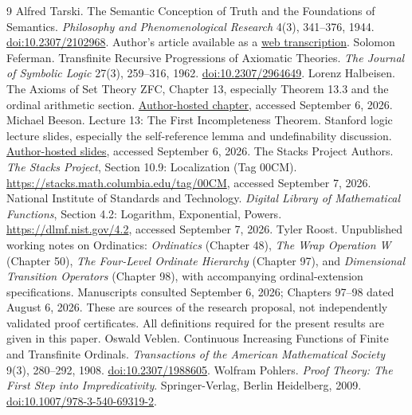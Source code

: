 \documentclass[11pt]{article}
\theoremstyle{definition}
\begin{document}
\begin{thebibliography}{9}
\small
{} Alfred Tarski. The Semantic Conception of Truth and the Foundations of Semantics. \emph{Philosophy and Phenomenological Research} 4(3), 341--376, 1944. \href{https://doi.org/10.2307/2102968}{doi:10.2307/2102968}. Author's article available as a \href{https://www.jfsowa.com/logic/tarski.htm}{web transcription}.
 Solomon Feferman. Transfinite Recursive Progressions of Axiomatic Theories. \emph{The Journal of Symbolic Logic} 27(3), 259--316, 1962. \href{https://doi.org/10.2307/2964649}{doi:10.2307/2964649}.
 Lorenz Halbeisen. The Axioms of Set Theory ZFC, Chapter 13, especially Theorem 13.3 and the ordinal arithmetic section. \href{https://people.math.ethz.ch/~halorenz/4students/LogikGT/Ch13.pdf}{Author-hosted chapter}, accessed September 6, 2026.
 Michael Beeson. Lecture 13: The First Incompleteness Theorem. Stanford logic lecture slides, especially the self-reference lemma and undefinability discussion. \href{https://www.michaelbeeson.com/teaching/StanfordLogic/Lecture13Slides.pdf}{Author-hosted slides}, accessed September 6, 2026.
 The Stacks Project Authors. \emph{The Stacks Project}, Section 10.9: Localization (Tag 00CM). \url{https://stacks.math.columbia.edu/tag/00CM}, accessed September 7, 2026.
 National Institute of Standards and Technology. \emph{Digital Library of Mathematical Functions}, Section 4.2: Logarithm, Exponential, Powers. \url{https://dlmf.nist.gov/4.2}, accessed September 7, 2026.
 Tyler Roost. Unpublished working notes on Ordinatics: \emph{Ordinatics} (Chapter 48), \emph{The Wrap Operation W} (Chapter 50), \emph{The Four-Level Ordinate Hierarchy} (Chapter 97), and \emph{Dimensional Transition Operators} (Chapter 98), with accompanying ordinal-extension specifications. Manuscripts consulted September 6, 2026; Chapters 97--98 dated August 6, 2026. These are sources of the research proposal, not independently validated proof certificates. All definitions required for the present results are given in this paper.
 Oswald Veblen. Continuous Increasing Functions of Finite and Transfinite Ordinals. \emph{Transactions of the American Mathematical Society} 9(3), 280--292, 1908. \href{https://doi.org/10.2307/1988605}{doi:10.2307/1988605}.
 Wolfram Pohlers. \emph{Proof Theory: The First Step into Impredicativity}. Springer-Verlag, Berlin Heidelberg, 2009. \href{https://doi.org/10.1007/978-3-540-69319-2}{doi:10.1007/978-3-540-69319-2}.
\end{thebibliography}
\end{document}
